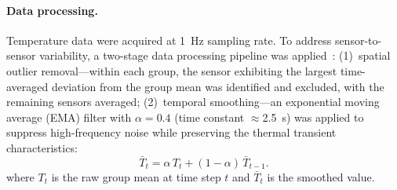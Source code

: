 \paragraph{Data processing.}
Temperature data were acquired at 1~Hz sampling rate. To address sensor-to-sensor variability, a two-stage data processing pipeline was applied~\cite{piacquadio2022experimental}: (1)~spatial outlier removal---within each group, the sensor exhibiting the largest time-averaged deviation from the group mean was identified and excluded, with the remaining sensors averaged; (2)~temporal smoothing---an exponential moving average (EMA) filter with $\alpha = 0.4$ (time constant $\approx$2.5~s) was applied to suppress high-frequency noise while preserving the thermal transient characteristics:
\begin{equation}
  \bar{T}_t = \alpha \, T_t + (1 - \alpha)\,\bar{T}_{t-1}.
  \label{eq:ema}
\end{equation}
where $T_t$ is the raw group mean at time step $t$ and $\bar{T}_t$ is the smoothed value.
